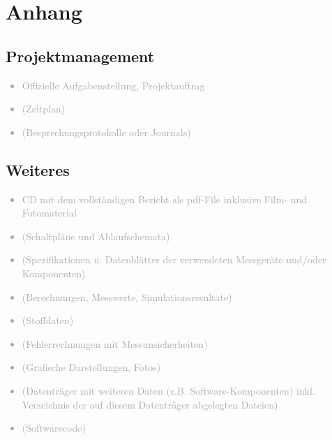 
\appendix
\chapter{Anhang}
\label{sec:Anhang}

\section{Projektmanagement}\label{projektmanagement}

\textcolor{darkgray}{
  \begin{itemize}
  \item Offizielle Aufgabenstellung, Projektauftrag
  \item (Zeitplan)
  \item (Besprechungsprotokolle oder Journals)
  \end{itemize}
}

\section{Weiteres}
\label{sec:Weiteres}

\textcolor{darkgray}{
  \begin{itemize}
  \item CD mit dem vollständigen Bericht als pdf-File inklusive Film- und Fotomaterial
  \item (Schaltpläne und Ablaufschemata)
  \item (Spezifikationen u. Datenblätter der verwendeten Messgeräte und/oder Komponenten)
  \item (Berechnungen, Messwerte, Simulationsresultate)
  \item (Stoffdaten)
  \item (Fehlerrechnungen mit Messunsicherheiten)
  \item (Grafische Darstellungen, Fotos)
  \item (Datenträger mit weiteren Daten (z.B. Software-Komponenten) inkl. Verzeichnis der auf diesem Datenträger abgelegten Dateien)
  \item (Softwarecode)
  \end{itemize}
}
